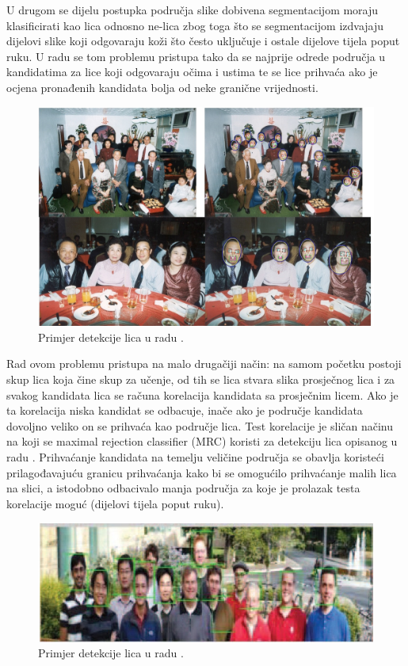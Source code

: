 \documentclass[times, utf8, seminar, numeric]{fer}
\begin{document}
U drugom se dijelu postupka područja slike dobivena segmentacijom moraju klasificirati kao lica odnosno ne-lica zbog toga što se segmentacijom izdvajaju dijelovi slike koji odgovaraju koži što često uključuje i ostale dijelove tijela poput ruku. U radu \cite{Senior:2002:FDC:513073.513082} se tom problemu pristupa tako da se najprije odrede područja u kandidatima za lice koji odgovaraju očima i ustima te se lice prihvaća ako je ocjena pronađenih kandidata bolja od neke granične vrijednosti. 

\begin{figure}[!htb]
\centering
\includegraphics[width=\textwidth]{raw/detekcija_pr1.jpg}
\caption{Primjer detekcije lica u radu \cite{Senior:2002:FDC:513073.513082}.}
\label{fig:detekcija_pr1}
\end{figure}

Rad \cite{conf/isda/ChandrappaR12} ovom problemu pristupa na malo drugačiji način: na samom početku postoji skup lica koja čine skup za učenje, od tih se lica stvara slika prosječnog lica i za svakog kandidata lica se računa korelacija kandidata sa prosječnim licem. Ako je ta korelacija niska kandidat se odbacuje, inače ako je područje kandidata dovoljno veliko on se prihvaća kao područje lica. Test korelacije je sličan načinu na koji se maximal rejection classifier (MRC) koristi za detekciju lica opisanog u radu \cite{Elad00patterndetection}. Prihvaćanje kandidata na temelju veličine područja se obavlja koristeći prilagođavajuću granicu prihvaćanja kako bi se omogućilo prihvaćanje malih lica na slici, a istodobno odbacivalo manja područja za koje je prolazak testa korelacije moguć (dijelovi tijela poput ruku).

\begin{figure}[!htb]
\centering
\includegraphics[width=\textwidth]{raw/detekcija_pr2.jpg}
\caption{Primjer detekcije lica u radu \cite{conf/isda/ChandrappaR12}.}
\label{fig:detekcija_pr2}
\end{figure}
\end{document}
